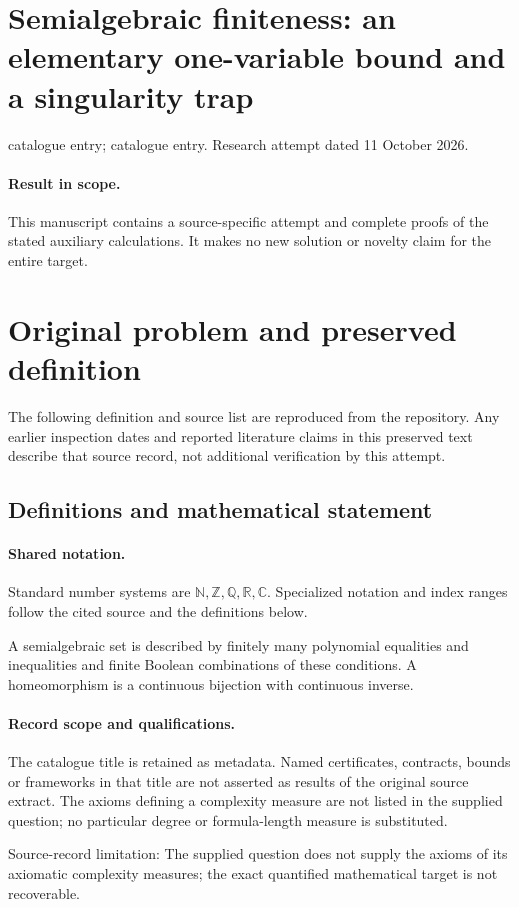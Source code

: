 \documentclass[11pt]{article}
\begin{document}
\section*{Semialgebraic finiteness: an elementary one-variable bound and a singularity trap}
\noindent catalogue entry; catalogue entry. Research attempt dated 11 October 2026.
\paragraph{Result in scope.}This manuscript contains a source-specific attempt and complete proofs of the stated auxiliary calculations. It makes no new solution or novelty claim for the entire target.
\section{Original problem and preserved definition}
The following definition and source list are reproduced from the repository. Any earlier inspection dates and reported literature claims in this preserved text describe that source record, not additional verification by this attempt.
\subsection{Definitions and mathematical statement}

\paragraph{Shared notation.}Standard number systems are $\mathbb N,\mathbb Z,\mathbb Q,\mathbb R,\mathbb C$. Specialized notation and index ranges follow the cited source and the definitions below.


A semialgebraic set is described by finitely many polynomial equalities and inequalities and finite Boolean combinations of these conditions. A homeomorphism is a continuous bijection with continuous inverse.
\paragraph{Record scope and qualifications.}
The catalogue title is retained as metadata. Named certificates, contracts, bounds or frameworks in that title are not asserted as results of the original source extract.
The axioms defining a complexity measure are not listed in the supplied question; no particular degree or formula-length measure is substituted.

Source-record limitation: The supplied question does not supply the axioms of its axiomatic complexity measures; the exact quantified mathematical target is not recoverable.
\end{document}
